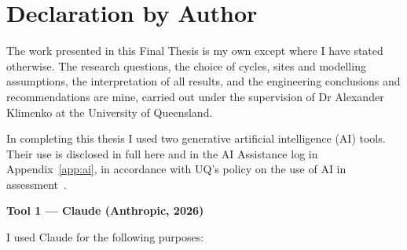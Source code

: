\chapter*{Declaration by Author}
The work presented in this Final Thesis is my own except where I have stated
otherwise. The research questions, the choice of cycles, sites and modelling
assumptions, the interpretation of all results, and the engineering
conclusions and recommendations are mine, carried out under the supervision
of Dr Alexander Klimenko at the University of Queensland.

In completing this thesis I used two generative artificial intelligence (AI)
tools. Their use is disclosed in full here and in the AI Assistance log in
Appendix~\ref{app:ai}, in accordance with UQ's policy on the use of AI in
assessment~\cite{UQ2026AI}.

\bigskip
\noindent\textbf{Tool 1 --- Claude (Anthropic, 2026)~\cite{Anthropic2026}}

\noindent I used Claude for the following purposes:

